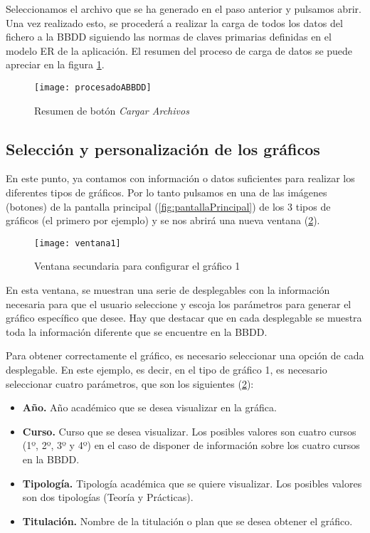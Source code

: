 Seleccionamos el archivo que se ha generado en el paso anterior y pulsamos abrir. Una vez realizado esto, se procederá a realizar la carga de todos los datos del fichero a la BBDD siguiendo las normas de claves primarias definidas en el modelo ER de la aplicación. El resumen del proceso de carga de datos se puede apreciar en la figura \ref{fig:procesadoABBDD}. 

\begin{figure}%
		\centering
		\texttt{[image: procesadoABBDD]}
		\caption{Resumen de botón \emph{Cargar Archivos}}\label{fig:procesadoABBDD}
	\end{figure}



\subsection{Selección y personalización de los gráficos}

En este punto, ya contamos con información o datos suficientes para realizar los diferentes tipos de gráficos.
Por lo tanto pulsamos en una de las imágenes (botones) de la pantalla principal (\ref{fig:pantallaPrincipal}) de los 3 tipos de gráficos (el primero por ejemplo) y se nos abrirá una nueva ventana (\ref{fig:ventana1}).

\begin{figure}%
		\centering
		\texttt{[image: ventana1]}
		\caption{Ventana secundaria para configurar el gráfico 1}\label{fig:ventana1}
	\end{figure}

En esta ventana, se muestran una serie de desplegables con la información necesaria para que el usuario seleccione y escoja los parámetros para generar el gráfico específico que desee. Hay que destacar que en cada desplegable se muestra toda la información diferente que se encuentre en la BBDD.

	
Para obtener correctamente el gráfico, es necesario seleccionar una opción de cada desplegable. En este ejemplo, es decir, en el tipo de gráfico 1, es necesario seleccionar cuatro parámetros, que son los siguientes (\ref{fig:ventana1}):


\begin{itemize}
\item \textbf{Año.} Año académico que se desea visualizar en la gráfica.
\item \textbf{Curso.} Curso que se desea visualizar. Los posibles valores son cuatro cursos (1º, 2º, 3º y 4º) en el caso de disponer de información sobre los cuatro cursos en la BBDD.
\item \textbf{Tipología.} Tipología académica que se quiere visualizar. Los posibles valores son dos tipologías (Teoría y Prácticas).
\item \textbf{Titulación.} Nombre de la titulación o plan que se desea obtener el gráfico.
\end{itemize}
   
